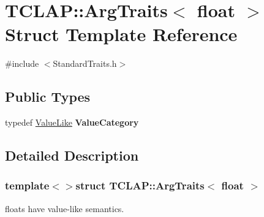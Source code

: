 \hypertarget{struct_t_c_l_a_p_1_1_arg_traits_3_01float_01_4}{\section{T\+C\+L\+A\+P\+:\+:Arg\+Traits$<$ float $>$ Struct Template Reference}
\label{struct_t_c_l_a_p_1_1_arg_traits_3_01float_01_4}
}


{\ttfamily \#include $<$Standard\+Traits.\+h$>$}

\subsection*{Public Types}
\begin{DoxyCompactItemize}
\item 
\hypertarget{struct_t_c_l_a_p_1_1_arg_traits_3_01float_01_4_ace983d74b1b28caa692840da15313acf}{typedef \hyperlink{struct_t_c_l_a_p_1_1_value_like}{Value\+Like} {\bfseries Value\+Category}}\label{struct_t_c_l_a_p_1_1_arg_traits_3_01float_01_4_ace983d74b1b28caa692840da15313acf}

\end{DoxyCompactItemize}


\subsection{Detailed Description}
\subsubsection*{template$<$$>$struct T\+C\+L\+A\+P\+::\+Arg\+Traits$<$ float $>$}

floats have value-\/like semantics. 